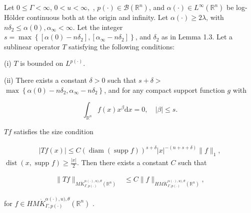 \documentclass[10pt,a4paper]{amsart}
\begin{document}
\begin{theorem}
    


 Let $0 \leq \Gamma<\infty$,  $0<u<\infty,$ , $p(\cdot) \in \mathcal{B}\left(\mathbb{R}^{n}\right)$, and $\alpha(\cdot) \in L^{\infty}\left(\mathbb{R}^{n}\right)$ be log-H\"older continuous both at the origin and infinity.  Let  $\alpha(\cdot)\geq 2\lambda$, with $n \delta_{2} \leq  \alpha(0), \alpha_{\infty}<\infty$. Let the integer $s=\max \left\{\left[\alpha(0)-n \delta_{2}\right],\left[\alpha_{\infty}-n \delta_{2}\right]\right\}$, and $\delta_{2}$ as in Lemma 1.3. Let a sublinear operator $T$ satisfying the following conditions:
 
 


(i) $T$ is bounded on $L^{p(\cdot)}$.

(ii) There exists a constant $\delta>0$ such that $s+\delta>$ $\max \left\{\alpha(0)-n \delta_{2}, \alpha_{\infty}-n \delta_{2}\right\}$, and for any compact support function $g$ with


\begin{equation*}
\int_{\mathbb{R}^{n}} f(x) x^{\beta} \mathrm{d} x=0, \quad|\beta| \leq  s. 
\end{equation*}


$Tf$ satisfies the size condition

\[
\begin{array}{r}
|T f(x)| \leq  C(\operatorname{diam}(\operatorname{supp} f))^{s+\delta}|x|^{-(n+s+\delta)}\|f\|_{1}  , 
\end{array}
\]
 $\operatorname{dist}(x, \text { supp } f) \geqslant \frac{|x|}{2}$. 
Then there exists a constant $C$ such that


\begin{align*}
\|T f\|_{M \dot{K} ^{\alpha(\cdot),u),\theta}_{ \Gamma, p(\cdot)}(\mathbb{R}^n)} & \leq  C\|f\|_{H M \dot{K} ^{\alpha(\cdot),u),\theta}_{ \Gamma, p(\cdot)}(\mathbb{R}^n)} ,
\end{align*}


for $f \in H {M \dot{K} ^{\alpha(\cdot),u),\theta}_{ \Gamma, p(\cdot)}(\mathbb{R}^n)}$ .



\end{theorem}
\end{document}

